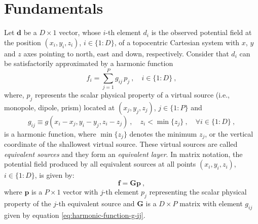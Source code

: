 \section{Fundamentals}

Let $\mathbf{d}$ be a $D \times 1$ vector, whose $i$-th element $d_{i}$ is the observed potential
field at the position $(x_{i}, y_{i}, z_{i})$, $i \in \{1:D\}$, of a topocentric Cartesian system with
$x$, $y$ and $z$ axes pointing to north, east and down, respectively.
Consider that $d_{i}$ can be satisfactorily approximated by a harmonic function
\begin{equation}
	f_{i} = \sum\limits_{j = 1}^{P} g_{ij} \, p_{j} \: ,
	\quad i \in \{1:D\} \: ,
	\label{eq:predicted-data-f-i}
\end{equation}
where, $p_{j}$ represents the scalar physical property of a virtual source (i.e., monopole, dipole, prism) located
at $(x_{j}, y_{j}, z_{j})$, $j \in \{1:P\}$ and 
\begin{equation}
	g_{ij} \equiv g(x_{i} - x_{j}, y_{i} - y_{j}, z_{i} - z_{j}) \: ,
	\quad z_{i} < \min\{z_{j}\} \: , \quad \forall i \in \{1:D\} \: ,
	\label{eq:harmonic-function-g-ij}
\end{equation}
is a harmonic function, where $\min\{z_{j}\}$ denotes the minimum $z_{j}$, or the vertical coordinate of the 
shallowest virtual source.
These virtual sources are called \textit{equivalent sources} and they form an \textit{equivalent layer}.
In matrix notation, the potential field produced by all equivalent sources at all points 
$(x_{i}, y_{i}, z_{i})$, $i \in \{1:D\}$, is given by:
\begin{equation}
	\mathbf{f} = \mathbf{G} \mathbf{p} \: ,
	\label{eq:predicted-data-vector}
\end{equation}
where $\mathbf{p}$ is a $P \times 1$ vector with $j$-th element $p_{j}$ representing the scalar physical property
of the $j$-th equivalent source 
and $\mathbf{G}$ is a $D \times P$ matrix with element $g_{ij}$ given by equation \ref{eq:harmonic-function-g-ij}. 

